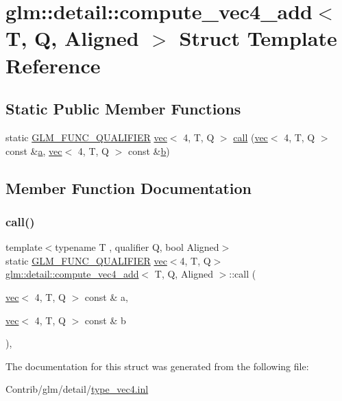 \hypertarget{structglm_1_1detail_1_1compute__vec4__add}{}\section{glm\+:\+:detail\+:\+:compute\+\_\+vec4\+\_\+add$<$ T, Q, Aligned $>$ Struct Template Reference}
\label{structglm_1_1detail_1_1compute__vec4__add}
\subsection*{Static Public Member Functions}
\begin{DoxyCompactItemize}
\item 
static \mbox{\hyperlink{setup_8hpp_a33fdea6f91c5f834105f7415e2a64407}{G\+L\+M\+\_\+\+F\+U\+N\+C\+\_\+\+Q\+U\+A\+L\+I\+F\+I\+ER}} \mbox{\hyperlink{structglm_1_1vec}{vec}}$<$ 4, T, Q $>$ \mbox{\hyperlink{structglm_1_1detail_1_1compute__vec4__add_a31e900b7f6b77e1053d4488b6fb81715}{call}} (\mbox{\hyperlink{structglm_1_1vec}{vec}}$<$ 4, T, Q $>$ const \&\mbox{\hyperlink{_s_d_l__opengl__glext_8h_a3309789fc188587d666cda5ece79cf82}{a}}, \mbox{\hyperlink{structglm_1_1vec}{vec}}$<$ 4, T, Q $>$ const \&\mbox{\hyperlink{_s_d_l__opengl__glext_8h_a0f71581a41fd2264c8944126dabbd010}{b}})
\end{DoxyCompactItemize}


\subsection{Member Function Documentation}
\mbox{\label{structglm_1_1detail_1_1compute__vec4__add_a31e900b7f6b77e1053d4488b6fb81715}} 
\subsubsection{\texorpdfstring{call()}{call()}}
{\footnotesize\ttfamily template$<$typename T , qualifier Q, bool Aligned$>$ \\
static \mbox{\hyperlink{setup_8hpp_a33fdea6f91c5f834105f7415e2a64407}{G\+L\+M\+\_\+\+F\+U\+N\+C\+\_\+\+Q\+U\+A\+L\+I\+F\+I\+ER}} \mbox{\hyperlink{structglm_1_1vec}{vec}}$<$4, T, Q$>$ \mbox{\hyperlink{structglm_1_1detail_1_1compute__vec4__add}{glm\+::detail\+::compute\+\_\+vec4\+\_\+add}}$<$ T, Q, Aligned $>$\+::call (\begin{DoxyParamCaption}\item[{\mbox{\hyperlink{structglm_1_1vec}{vec}}$<$ 4, T, Q $>$ const \&}]{a,  }\item[{\mbox{\hyperlink{structglm_1_1vec}{vec}}$<$ 4, T, Q $>$ const \&}]{b }\end{DoxyParamCaption})\hspace{0.3cm}{\ttfamily [inline]}, {\ttfamily [static]}}



The documentation for this struct was generated from the following file\+:\begin{DoxyCompactItemize}
\item 
Contrib/glm/detail/\mbox{\hyperlink{type__vec4_8inl}{type\+\_\+vec4.\+inl}}\end{DoxyCompactItemize}
